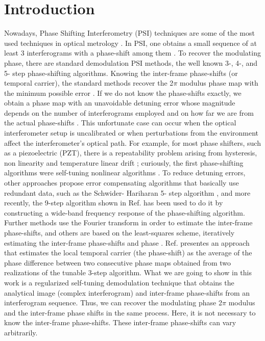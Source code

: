 \documentclass[letterpaper,12pt]{article}   %
\begin{document}
\section{Introduction}
Nowadays, Phase Shifting Interferometry (PSI) techniques are some of the most used 
techniques in optical metrology \cite{a1_OpticalTesting}. In PSI, one obtains a small 
sequence of at least 3 interferograms with a phase-shift among them 
\cite{a1_OpticalTesting}. To recover the modulating phase, there are standard 
demodulation PSI methods, the well known 3-, 4-, and 5- step phase-shifting algorithms. 
Knowing the inter-frame phase-shifts (or temporal carrier), the standard methods recover 
the 2$\pi$ modulus phase map with the minimum possible error 
\cite{a1_OpticalTesting,a2_F&K,a3}. If we do not know the phase-shifts exactly, we obtain 
a phase map with an unavoidable detuning error whose magnitude depends on the number of 
interferograms employed and on how far we are from the actual phase-shifts 
\cite{a3,a4,a5,a6}. This unfortunate case can occur when the optical interferometer setup 
is uncalibrated or when perturbations from the environment affect the interferometer's 
optical path. For example, for most phase shifters, such as a piezoelectric (PZT), there 
is a repeatability problem arising from hysteresis, non linearity and temperature linear 
drift \cite{a5,a7}; curiously, the first phase-shifting algorithms were self-tuning 
nonlinear algorithms \cite{a8,a9}. To reduce detuning errors, other approaches propose 
error compensating algorithms that basically use redundant data, such as the Schwider-
Hariharan 5- step algorithm \cite{a4,a10,a11}, and more recently, the 9-step algorithm 
shown in Ref. \cite{a12} has been used to do it by constructing a wide-band frequency 
response of the phase-shifting algorithm. Further methods use the Fourier transform in 
order to estimate the inter-frame phase-shifts, and others are based on the least-squares 
scheme, iteratively estimating the inter-frame phase-shifts and phase \cite{a13,a14}. 
Ref. \cite{a16} presentes an approach that estimates the local temporal carrier (the 
phase-shift) as the average of the phase difference between two consecutive phase maps 
obtained from two realizations of the tunable 3-step algorithm. What we are going to show 
in this work is a regularized self-tuning demodulation technique that obtains the 
analytical image (complex interferogram) and inter-frame phase-shifts from an 
interferogram sequence. Thus, we can recover the modulating phase 2$\pi$ modulus and the 
inter-frame phase shifts in the same process. Here, it is not necessary to know the 
inter-frame phase-shifts. These inter-frame phase-shifts can vary arbitrarily.
\end{document}

